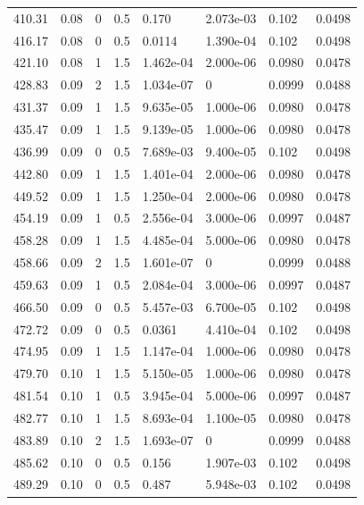 \documentclass[preview]{standalone}
\begin{document}
{{{\begin{tabular}{L{1.2cm}C{1.2cm} C{0.3cm}C{0.5cm} C{1.4cm}C{1.4cm} C{1.4cm}C{1.4cm}}
  410.31  &  0.08  & 0     & 0.5 &  0.170  & 2.073e-03  & 0.102 &  0.0498   \\ 
  416.17  &  0.08  & 0     & 0.5 &  0.0114  & 1.390e-04  & 0.102 &  0.0498   \\ 
  421.10  &  0.08  & 1     & 1.5 &  1.462e-04  & 2.000e-06  & 0.0980 &  0.0478   \\ 
  428.83  &  0.09  & 2     & 1.5 &  1.034e-07  & 0  & 0.0999 &  0.0488   \\ 
  431.37  &  0.09  & 1     & 1.5 &  9.635e-05  & 1.000e-06  & 0.0980 &  0.0478   \\ 
  435.47  &  0.09  & 1     & 1.5 &  9.139e-05  & 1.000e-06  & 0.0980 &  0.0478   \\ 
  436.99  &  0.09  & 0     & 0.5 &  7.689e-03  & 9.400e-05  & 0.102 &  0.0498   \\ 
  442.80  &  0.09  & 1     & 1.5 &  1.401e-04  & 2.000e-06  & 0.0980 &  0.0478   \\ 
  449.52  &  0.09  & 1     & 1.5 &  1.250e-04  & 2.000e-06  & 0.0980 &  0.0478   \\ 
  454.19  &  0.09  & 1     & 0.5 &  2.556e-04  & 3.000e-06  & 0.0997 &  0.0487   \\ 
  458.28  &  0.09  & 1     & 1.5 &  4.485e-04  & 5.000e-06  & 0.0980 &  0.0478   \\ 
  458.66  &  0.09  & 2     & 1.5 &  1.601e-07  & 0  & 0.0999 &  0.0488   \\ 
  459.63  &  0.09  & 1     & 0.5 &  2.084e-04  & 3.000e-06  & 0.0997 &  0.0487   \\ 
  466.50  &  0.09  & 0     & 0.5 &  5.457e-03  & 6.700e-05  & 0.102 &  0.0498   \\ 
  472.72  &  0.09  & 0     & 0.5 &  0.0361  & 4.410e-04  & 0.102 &  0.0498   \\ 
  474.95  &  0.09  & 1     & 1.5 &  1.147e-04  & 1.000e-06  & 0.0980 &  0.0478   \\ 
  479.70  &  0.10  & 1     & 1.5 &  5.150e-05  & 1.000e-06  & 0.0980 &  0.0478   \\ 
  481.54  &  0.10  & 1     & 0.5 &  3.945e-04  & 5.000e-06  & 0.0997 &  0.0487   \\ 
  482.77  &  0.10  & 1     & 1.5 &  8.693e-04  & 1.100e-05  & 0.0980 &  0.0478   \\ 
  483.89  &  0.10  & 2     & 1.5 &  1.693e-07  & 0  & 0.0999 &  0.0488   \\ 
  485.62  &  0.10  & 0     & 0.5 &  0.156  & 1.907e-03  & 0.102 &  0.0498   \\ 
  489.29  &  0.10  & 0     & 0.5 &  0.487  & 5.948e-03  & 0.102 &  0.0498   \\ 

\end{tabular}}}}
\end{document}
